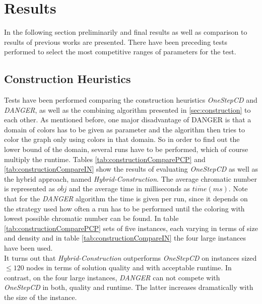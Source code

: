 \section{Results}
In the following section preliminarily and final results as well as comparison to results of previous works are presented. There have been preceding tests performed to select the most competitive ranges of parameters for the test.

\subsection{Construction Heuristics}
\label{sec:constructionheuristics}

Tests have been performed comparing the construction heuristics \textit{OneStepCD} and \textit{DANGER}, as well as the combining algorithm presented in \ref{sec:construction} to each other. As mentioned before, one major disadvantage of DANGER is that a domain of colors has to be given as parameter and the algorithm then tries to color the graph only using colors in that domain. So in order to find out the lower bound of the domain, several runs have to be performed, which of course multiply the runtime. Tables \ref{tab:constructionComparePCP} and \ref{tab:constructionCompareIN} show the results of evaluating \textit{OneStepCD} as well as the hybrid approach, named \textit{Hybrid-Construction}. The average chromatic number is represented as $\overline{obj}$ and the average time in milliseconds as $\overline{time}(ms)$. Note that for the \textit{DANGER} algorithm the time is given per run, since it depends on the strategy used how often a run has to be performed until the coloring with lowest possible chromatic number can be found. In table \ref{tab:constructionComparePCP} sets of five instances, each varying in terms of size and density and in table \ref{tab:constructionCompareIN} the four large instances have been used.\\

It turns out that \textit{Hybrid-Construction} outperforms \textit{OneStepCD} on instances sized $\leq 120$ nodes in terms of solution quality and with acceptable runtime. In contrast, on the four large instances, \textit{DANGER} can not compete with \textit{OneStepCD} in both, quality and runtime. The latter increases dramatically with the size of the instance.  
 

